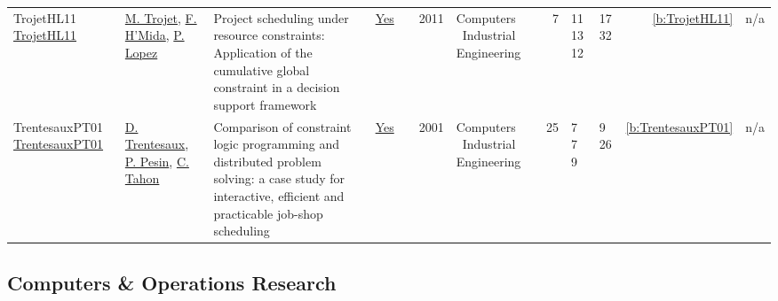 {\begin{longtable}{>{\raggedright\arraybackslash}p{3cm}>{\raggedright\arraybackslash}p{4.5cm}>{\raggedright\arraybackslash}p{6.0cm}rrrp{2.5cm}rp{1cm}p{1cm}rr}
TrojetHL11 \href{https://doi.org/10.1016/j.cie.2010.08.014}{TrojetHL11} & \hyperref[auth:a705]{M. Trojet}, \hyperref[auth:a706]{F. H'Mida}, \hyperref[auth:a3]{P. Lopez} & \cellcolor{green!10}Project scheduling under resource constraints: Application of the cumulative global constraint in a decision support framework & \href{../works/TrojetHL11.pdf}{Yes} & \cite{TrojetHL11} & 2011 & Computers \  Industrial Engineering & 7 & 11 13 12 & 17 32 & \ref{b:TrojetHL11} & n/a\\
TrentesauxPT01 \href{https://www.sciencedirect.com/science/article/pii/S0360835200000784}{TrentesauxPT01} & \hyperref[auth:a1458]{D. Trentesaux}, \hyperref[auth:a1459]{P. Pesin}, \hyperref[auth:a1460]{C. Tahon} & Comparison of constraint logic programming and distributed problem solving: a case study for interactive, efficient and practicable job-shop scheduling & \href{../works/TrentesauxPT01.pdf}{Yes} & \cite{TrentesauxPT01} & 2001 & Computers \  Industrial Engineering & 25 & 7 7 9 & 9 26 & \ref{b:TrentesauxPT01} & n/a\\
\end{longtable}
}

\subsection{Computers \& Operations Research}

